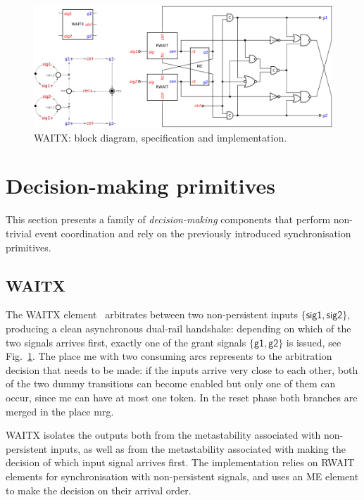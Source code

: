 \documentclass[conference]{IEEEtran}
\begin{document}
\begin{figure}
\begin{center}
    \includegraphics[scale=0.23]{fig/WAITX.pdf}
    \vspace{-2mm}
    \caption{\textsf{WAITX}: block diagram, specification and implementation.}
    \label{fig:waitx}
    \vspace{-6mm}
\end{center}
\end{figure}

\section{Decision-making primitives}\label{sec-decision}

This section presents a family of \emph{decision-making} components that perform
non-trivial event coordination and rely on the previously introduced synchronisation
primitives.

\subsection*{\textsf{WAITX}}

The \textsf{WAITX} element~\cite{2017_khomenko_waitx} arbitrates between two
non-persistent inputs $\{\textsf{sig1}, \textsf{sig2}\}$, producing a clean
asynchronous dual-rail handshake: depending on which of the two signals arrives
first, exactly one of the grant signals $\{\textsf{g1}, \textsf{g2}\}$ is issued, see
Fig.~\ref{fig:waitx}. The place \textsf{me} with two consuming arcs represents to
the arbitration decision that needs to be made: if the inputs arrive very close to
each other, both of the two dummy transitions can become enabled but only one
of them can occur, since \textsf{me} can have at most one token. In the reset phase
both branches are merged in the place \textsf{mrg}.

\textsf{WAITX} isolates the outputs
both from the metastability associated with non-persistent inputs, as well as from
the metastability associated with making the decision of which input signal arrives first.
The implementation relies on \textsf{RWAIT} elements for synchronisation with
non-persistent signals, and uses an \textsf{ME} element to make the decision on their
arrival order.
\end{document}
